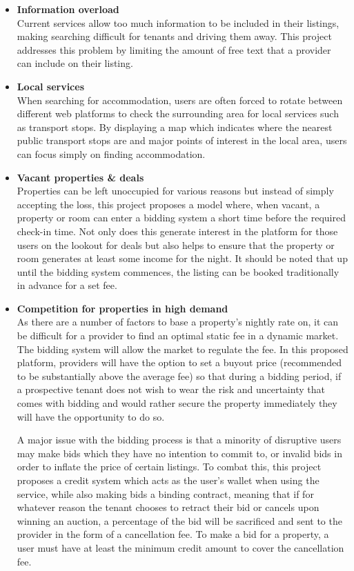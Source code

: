 \documentclass[12pt,a4paper]{article}
\begin{document}
\begin{itemize}
  \item \textbf{Information overload} \\
        Current services allow too much information to be included in their listings, making searching difficult for tenants and driving them away. This project addresses this problem by limiting the amount of free text that a provider can include on their listing.
  \item \textbf{Local services} \\
        When searching for accommodation, users are often forced to rotate between different web platforms to check the surrounding area for local services such as transport stops. By displaying a map which indicates where the nearest public transport stops are and major points of interest in the local area, users can focus simply on finding accommodation.
  \item \textbf{Vacant properties \& deals} \\
        Properties can be left unoccupied for various reasons but instead of simply accepting the loss, this project proposes a model where, when vacant, a property or room can enter a bidding system a short time before the required check-in time. Not only does this generate interest in the platform for those users on the lookout for deals but also helps to ensure that the property or room generates at least some income for the night. It should be noted that up until the bidding system commences, the listing can be booked traditionally in advance for a set fee.
  \item \textbf{Competition for properties in high demand} \\
        As there are a number of factors to base a property’s nightly rate on, it can be difficult for a provider to find an optimal static fee in a dynamic market. The bidding system will allow the market to regulate the fee. In this proposed platform, providers will have the option to set a buyout price (recommended to be substantially above the average fee) so that during a bidding period, if a prospective tenant does not wish to wear the risk and uncertainty that comes with bidding and would rather secure the property immediately they will have the opportunity to do so.

A major issue with the bidding process is that a minority of disruptive users may make bids which they have no intention to commit to, or invalid bids in order to inflate the price of certain listings. To combat this, this project proposes a credit system which acts as the user’s wallet when using the service, while also making bids a binding contract, meaning that if for whatever reason the tenant chooses to retract their bid or cancels upon winning an auction, a percentage of the bid will be sacrificed and sent to the provider in the form of a cancellation fee. To make a bid for a property, a user must have at least the minimum credit amount to cover the cancellation fee.
\end{itemize}
\end{document}
